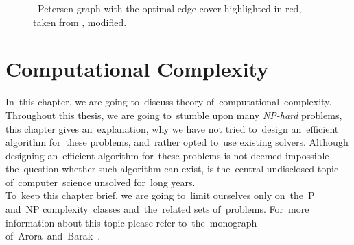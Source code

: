 \begin{center}
    \begin{figure}[h!]
        \centering
        \caption[Petersen graph with the~optimal edge cover]{~Petersen graph with the optimal edge cover highlighted in red, taken from \cite{soPetersen}, modified.}
        \label{fig:ec_petersen}
    \end{figure}
\end{center}

\chapter{Computational Complexity}
In~this chapter, we are going to~discuss theory of~computational~complexity. Throughout this thesis, we are going to~stumble upon many \textit{NP-hard} problems, this chapter gives an~explanation, why we have not tried to~design an~efficient algorithm for~these problems, and~rather opted to~use existing solvers. Although designing an~efficient algorithm for~these problems is not deemed impossible the~question whether such algorithm can exist, is the~central undisclosed topic of~computer~science unsolved for~long years. \\
To~keep this chapter brief, we are going to~limit ourselves only on~the~P and~NP complexity~classes and~the~related sets of~problems. For~more information about this topic please refer to~the~monograph of~Arora~and~Barak~\cite{Arora}.
